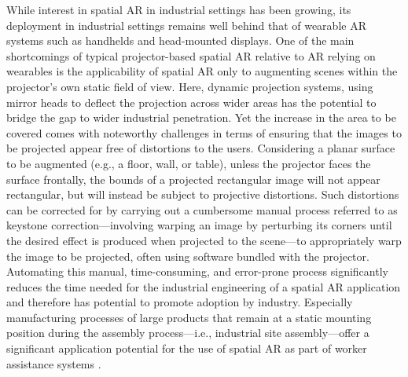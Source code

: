 \documentclass[review]{elsarticle}
\begin{document}
While interest in spatial AR in industrial settings has been growing, its deployment in industrial settings remains well behind that of wearable AR systems such as handhelds and head-mounted displays. One of the main shortcomings of typical projector-based spatial AR relative to AR relying on wearables is the applicability of spatial AR only to augmenting scenes within the projector's own static field of view. Here, dynamic projection systems, using mirror heads to deflect the projection across wider areas has the potential to bridge the gap to wider industrial penetration. Yet the increase in the area to be covered comes with noteworthy challenges in terms of ensuring that the images to be projected appear free of distortions to the users. Considering a planar surface to be augmented (e.g., a floor, wall, or table), unless the projector faces the surface frontally, the bounds of a projected rectangular image will not appear rectangular, but will instead be subject to projective distortions. Such distortions can be corrected for by carrying out a cumbersome manual process referred to as keystone correction---involving warping an image by perturbing its corners until the desired effect is produced when projected to the scene---to appropriately warp the image to be projected, often using software bundled with the projector. Automating this manual, time-consuming, and error-prone process significantly reduces the time needed for the industrial engineering of a spatial AR application and therefore has potential to promote adoption by industry. Especially manufacturing processes of large products that remain at a static mounting position during the assembly process---i.e., industrial site assembly---offer a significant application potential for the use of spatial AR as part of worker assistance systems \cite{mayrhofer2019one}.
\end{document}
